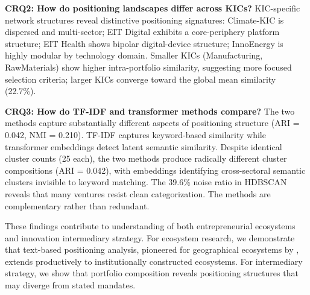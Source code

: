 \documentclass[../main.tex]{subfiles}
\begin{document}
\textbf{CRQ2: How do positioning landscapes differ across KICs?} KIC-specific network structures reveal distinctive positioning signatures: Climate-KIC is dispersed and multi-sector; EIT Digital exhibits a core-periphery platform structure; EIT Health shows bipolar digital-device structure; InnoEnergy is highly modular by technology domain. Smaller KICs (Manufacturing, RawMaterials) show higher intra-portfolio similarity, suggesting more focused selection criteria; larger KICs converge toward the global mean similarity (22.7\%).

\textbf{CRQ3: How do TF-IDF and transformer methods compare?} The two methods capture substantially different aspects of positioning structure (ARI = 0.042, NMI = 0.210). TF-IDF captures keyword-based similarity while transformer embeddings detect latent semantic similarity. Despite identical cluster counts (25 each), the two methods produce radically different cluster compositions (ARI = 0.042), with embeddings identifying cross-sectoral semantic clusters invisible to keyword matching. The 39.6\% noise ratio in HDBSCAN reveals that many ventures resist clean categorization. The methods are complementary rather than redundant.

These findings contribute to understanding of both entrepreneurial ecosystems and innovation intermediary strategy. For ecosystem research, we demonstrate that text-based positioning analysis, pioneered for geographical ecosystems by \cite{basole2019visual}, extends productively to institutionally constructed ecosystems. For intermediary strategy, we show that portfolio composition reveals positioning structures that may diverge from stated mandates.
\end{document}
